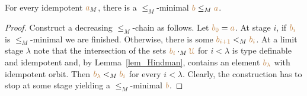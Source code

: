 \documentclass[creche.tex]{subfiles}
\begin{document}




\begin{proposition}
For every idempotent ${\color{brown} a}_M$, there is a $\le_M$-minimal ${\color{brown} b}\le_M{\color{brown} a}$.
\end{proposition}

\begin{proof}
Construct a decreasing $\le_M$-chain as follows.
Let ${\color{brown} b_0}={\color{brown} a}$.
At stage $i$, if ${\color{brown} b_i}$ is $\le_M$-minimal we are finished.
Otherwise, there is some ${\color{brown} b_{i+1}}<_M{\color{brown} b_i}$.
At a limit stage $\lambda$ note that the intersection of the sets ${\color{brown} b_i}\cdot_M{\color{brown}\EuScript U}$ for $i<\lambda$
is type definable and idempotent
and, by Lemma~\ref{lem_Hindman}, contains an element ${\color{brown} b_\lambda}$ with idempotent orbit.
Then ${\color{brown} b_\lambda}<_M{\color{brown} b_i}$  for every $i<\lambda$.
Clearly, the construction has to stop at some stage yielding a $\le_M$-minimal ${\color{brown} b}$.
\end{proof}
\clearpage
\end{document}
